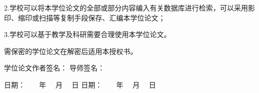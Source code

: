\begin{titlepage}
\begin{spacing}{1.5}
{    2.学校可以将本学位论文的全部或部分内容编入有关数据库进行检索，可以采用影印、缩印或扫描等复制手段保存、汇编本学位论文；
    
    3.学校可以基于教学及科研需要合理使用本学位论文。
    
    需保密的学位论文在解密后适用本授权书。
    
    \hspace*{1em}
    
    \hspace*{1em}
    
    学位论文作者签名：\hspace*{160pt} 导师签名：
    
    \hspace*{1em}
    
    日期：~~~~年 ~~月 ~~日 \hspace*{160pt} 日期：~~~~年 ~~月 ~~日
    }
    \end{spacing}
    
    \end{titlepage}
    
